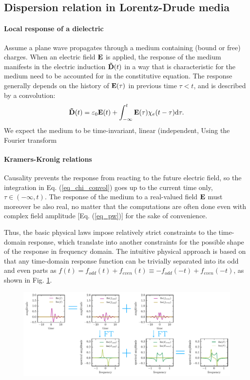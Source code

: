 \documentclass[letterpaper,12pt]{report}
\begin{document}
\subsection{Dispersion relation in Lorentz-Drude media} 
\paragraph{Local response of a dielectric} Assume a plane wave propagates through a medium containing (bound or free) charges. When an electric field $\mathbf{E}$ is applied, the response of the medium manifests in the electric induction $\mathbf{\tilde{D}}(t)$ in a way that is characteristic for the medium need to be accounted for in the constitutive equation. The response generally depends on the history of $\mathbf{E}(\tau)$ in previous time $\tau < t$, and is described by a convolution:
\begin{equation} \mathbf{\tilde{D}}(t) = \varepsilon_0 \mathbf{E}(t) + \int_{-\infty}^{t} \mathbf{E}(\tau) \chi_e(t-\tau) \mbox{d}\tau. \label{eq_chi_convol}\end{equation}
We expect the medium to be time-invariant, linear (independent, 
Using the Fourier transform


\paragraph{Kramers-Kronig relations}
Causality prevents the response from reacting to the future electric field, so the integration in Eq. (\ref{eq_chi_convol}) goes up to the current time only, $\tau \in (-\infty, t)$. The response of the medium to a real-valued field $\mathbf{E}$ must moreover be also real, no matter that the computations are often done even with complex field amplitude [Eq. (\ref{eq_pw})] for the sake of convenience. 

Thus, the basic physical laws impose relatively strict constraints to the time-domain response, which translate into another constraints for the possible shape of the response in frequency domain. The intuitive physical approach is based on that any time-domain response function can be trivially separated into its odd and even parts as $f(t) = f_{odd}(t) + f_{even}(t) \equiv -f_{odd}(-t) + f_{even}(-t) $, as shown in Fig. \ref{fg_kk}. 
\begin{figure}[h] \caption{} \label{fg_kk} \centering 
	\includegraphics[width=18cm]{img/Kramers_Kronig_plot/kk.pdf}
\end{figure}
\end{document}
